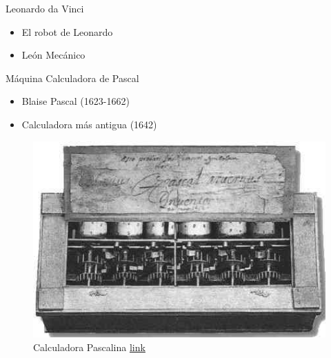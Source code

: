 
\begin{frame}[fragile]{Leonardo da Vinci}
\vspace{10px}
\pause
{}
\begin{block}{}
	\begin{itemize}
		\item El robot de Leonardo
		\pause
		\item León Mecánico
	\end{itemize}
\end{block}
\end{frame}



\begin{frame}[fragile]{Máquina Calculadora de Pascal}
\vspace{10px}
\pause
{}
\begin{block}{}
	\begin{itemize}
		\item Blaise Pascal (1623-1662)
		\pause
		\item Calculadora más antigua (1642)
	\end{itemize}
\end{block}
\begin{figure}
		\centering
		\includegraphics[scale=0.3]{./EtapaPrimeriza/imagenes/cp.jpg}
		\caption{Calculadora Pascalina \href{https://www.tispain.com/2014/11/la-pascalina-la-primera-calculadora.html}{link}}
\end{figure}
\end{frame}




